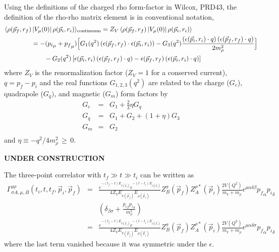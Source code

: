 \documentclass[12pt]{article}
\begin{document}
Using the definitions of the charged rho form-factor in Wilcox, PRD43,
the definition of the rho-rho matrix element is in conventional notation,
\begin{gather}
\begin{split}
\langle\rho(\vec{p}_f,r_f)&\left|V_\mu(0)\right|\rho(\vec{p}_i,r_i)\rangle_{\rm continuum}
 = Z_V\left<\rho(\vec{p}_f,r_f)\left|V_\mu(0)\right|\rho(\vec{p}_i,r_i)\right> \\
&= -({p_i}_\mu + {p_f}_\mu) \Big[
   G_1(q^2)\left(\epsilon(\vec{p}_f,r_f)\cdot\epsilon(\vec{p}_i,r_i)\right)
 - G_3(q^2)\frac{\left(\epsilon(\vec{p}_i,r_i)\cdot q\right)
                 \left(\epsilon(\vec{p}_f,r_f)\cdot q\right)}{2 m_\rho^2}
 \Big] \\
&\qquad - G_2(q^2)\left[\epsilon(\vec{p}_i,r_i)\left(\epsilon(\vec{p}_f,r_f)\cdot q\right)
               - \epsilon(\vec{p}_f,r_f)\left(\epsilon(\vec{p}_i,r_i)\cdot q\right)\right]
\end{split}
\end{gather}
%
where $Z_V$ is the renormalization factor ($Z_V=1$ for a conserved current),
$q=p_f-p_i$ and the real functions $G_{1,2,3}(q^2)$ are related to the charge 
($G_c$), quadrapole ($G_q)$, and magnetic ($G_m$) form factors by
%
\begin{eqnarray}
G_c &=& G_1 + \frac{2}{3}\eta G_q \nonumber\\
G_q &=& G_1 + G_2 + (1+\eta)G_3 \nonumber\\
G_m &=& G_2 \nonumber\\
\end{eqnarray}
and $\eta\equiv -q^2/4m_\rho^2 \,\ge\, 0$.


{\bf UNDER CONSTRUCTION}
 

The three-point correlator with $t_f\gg t\gg t_i$ can be written as
\begin{eqnarray}
\Gamma^{\rho\rho}_{\sigma A,\mu,B}(t_i,t,t_f,\vec p_i,\vec p_f)
&=& \frac{e^{-(t_f-t)E_{\pi(\vec{p}_f)}}e^{-(t-t_i)E_{\rho(\vec{p}_i)}}}
   {4Z_V E_{\pi(\vec{p}_f)}E_{\rho(\vec{p}_i)}}
   Z_B^\pi(\vec p_f)Z_A^{\rho*}(\vec p_i)\frac{2V(Q^2)}{m_\pi
     +m_\rho}\epsilon^{\mu\alpha\delta\beta}{p_f}_\alpha{p_i}_\delta
     \nonumber \\ && \left(
     \delta_{\beta\sigma}+\frac{{p_i}_\beta{p_i}_\sigma}{m_\rho^2}\right) \nonumber\\
&=& \frac{e^{-(t_f-t)E_{\pi(\vec{p}_f)}}e^{-(t-t_i)E_{\rho(\vec{p}_i)}}}
   {4Z_V E_{\pi(\vec{p}_f)}E_{\rho(\vec{p}_i)}}
   Z_B^\pi(\vec p_f)Z_A^{\rho*}(\vec p_i)\frac{2V(Q^2)}{m_\pi
     +m_\rho}\epsilon^{\mu\alpha\delta\sigma}{p_f}_\alpha{p_i}_\delta \nonumber
\end{eqnarray}
where the last term vanished because it was symmetric under the $\epsilon$.
\vspace{5mm}
\end{document}
